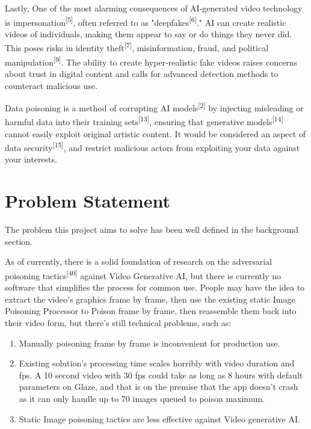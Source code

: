 Lastly, One of the most alarming consequences of AI-generated video technology is impersonation\textsuperscript{[5]}, often referred to as "deepfakes\textsuperscript{[6]}." AI can create realistic videos of individuals, making them appear to say or do things they never did. This poses risks in identity theft\textsuperscript{[7]}, misinformation, fraud, and political manipulation\textsuperscript{[9]}. The ability to create hyper-realistic fake videos raises concerns about trust in digital content and calls for advanced detection methods to counteract malicious use.

Data poisoning is a method of corrupting AI models\textsuperscript{[2]} by injecting misleading or harmful data into their training sets\textsuperscript{[13]}, ensuring that generative models\textsuperscript{[14]} cannot easily exploit original artistic content. It would be considered an aspect of data security\textsuperscript{[15]}, and restrict malicious actors from exploiting your data against your interests.

\section{Problem Statement}
\label{section:problem-statement}
The problem this project aims to solve has been well defined in the background section. \newline

As of currently, there is a solid foundation of research on the adversarial poisoning tactics\textsuperscript{[40]} against Video Generative AI, but there is currently no software that simplifies the process for common use. People may have the idea to extract the video’s graphics frame by frame, then use the existing static Image Poisoning Processor to Poison frame by frame, then reassemble them back into their video form, but there’s still technical problems, such as:

\begin{enumerate}
        \item Manually poisoning frame by frame is inconvenient for production use.
        \item Existing solution’s processing time scales horribly with video duration and fps. A 10 second video with 30 fps could take as long as 8 hours with default parameters on Glaze, and that is on the premise that the app doesn’t crash as it can only handle up to 70 images queued to poison maximum.
        \item Static Image poisoning tactics are less effective against Video generative AI.
\end{enumerate}

